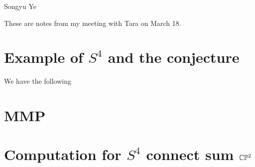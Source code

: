 \documentclass[12pt]{article}
\begin{document}
Songyu Ye

These are notes from my meeting with Tara on March 18.

\section{Example of $S^4$ and the conjecture}
We have the following 
\section{MMP}
\section{Computation for $S^4$ connect sum $\mathbb{C}\mathbb{P}^2$} 
\end{document}
